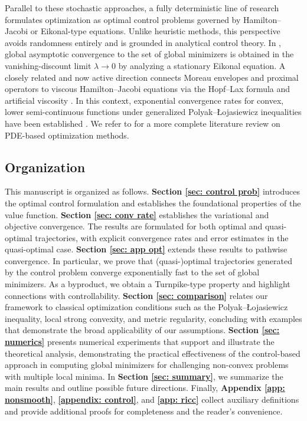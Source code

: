 \documentclass[12pt]{amsart}
\numberwithin{equation}{section}
\theoremstyle{plain}
\begin{document}
Parallel to these stochastic approaches, a fully deterministic line of research formulates optimization as optimal control problems governed by Hamilton--Jacobi or Eikonal-type equations. Unlike heuristic methods, this perspective avoids randomness entirely and is grounded in analytical control theory. In \cite{bardi2023eikonal}, global asymptotic convergence to the set of global minimizers is obtained in the vanishing-discount limit $\lambda \to 0$ by analyzing a stationary Eikonal equation. A closely related and now active direction connects Moreau envelopes and proximal operators to viscous Hamilton--Jacobi equations via the Hopf--Lax formula and artificial viscosity \cite{osher2023hamilton,heaton2024global}. In this context, exponential convergence rates for convex, lower semi-continuous functions under generalized Polyak--\L{}ojasiewicz inequalities have been established \cite{apidopoulos2022nonconvex}. We refer to \cite{huang2025control} for a more complete literature review on PDE-based optimization methods.

\subsection*{Organization}
This manuscript is organized as follows. \textbf{Section \ref{sec: control prob}} introduces the optimal control formulation and establishes the foundational properties of the value function. \textbf{Section \ref{sec: conv rate}} establishes the variational and objective convergence. The results are formulated for both optimal and quasi-optimal trajectories, with explicit convergence rates and error estimates in the quasi-optimal case. \textbf{Section \ref{sec: app opt}} extends these results to pathwise convergence. In particular, we prove that (quasi-)optimal trajectories generated by the control problem converge exponentially fast to the set of global minimizers. As a byproduct, we obtain a Turnpike-type property and highlight connections with controllability. \textbf{Section \ref{sec: comparison}} relates our framework to classical optimization conditions such as the Polyak--\L{}ojasiewicz inequality, local strong convexity, and metric regularity, concluding with examples that demonstrate the broad applicability of our assumptions. \textbf{Section \ref{sec: numerics}} presents numerical experiments that support and illustrate the theoretical analysis, demonstrating the practical effectiveness of the control-based approach in computing global minimizers for challenging non-convex problems with multiple local minima. In \textbf{Section \ref{sec: summary}}, we summarize the main results and outline possible future directions. Finally, \textbf{Appendix \ref{app: nonsmooth}}, \textbf{\ref{appendix: control}}, and \textbf{\ref{app: ricc}} collect auxiliary definitions and provide additional proofs for completeness and the reader's convenience.
\end{document}
